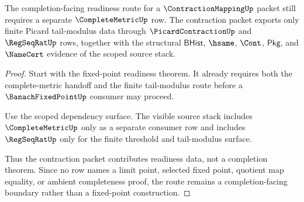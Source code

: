 \begin{theorem}
\label{thm:contraction-mapping-completion-readiness-scope}
The completion-facing readiness route for a $\ContractionMappingUp$ packet still requires a separate $\CompleteMetricUp$ row. The contraction packet exports only finite Picard tail-modulus data through $\PicardContractionUp$ and $\RegSeqRatUp$ rows, together with the structural $\mathsf{BHist}$, $\hsame$, $\Cont$, $\mathsf{Pkg}$, and $\NameCert$ evidence of the scoped source stack.
\end{theorem}
\begin{proof}
Start with the fixed-point readiness theorem. It already requires both the complete-metric handoff and the finite tail-modulus route before a $\BanachFixedPointUp$ consumer may proceed.

Use the scoped dependency surface. The visible source stack includes $\CompleteMetricUp$ only as a separate consumer row and includes $\RegSeqRatUp$ only for the finite threshold and tail-modulus surface.

Thus the contraction packet contributes readiness data, not a completion theorem. Since no row names a limit point, selected fixed point, quotient map equality, or ambient completeness proof, the route remains a completion-facing boundary rather than a fixed-point construction.
\end{proof}

